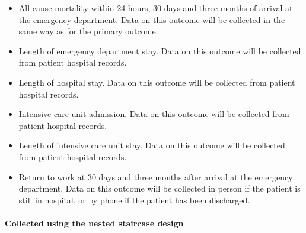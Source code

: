 \documentclass[
]{scrartcl}
\let\oldparagraph\paragraph
\renewcommand{\paragraph}[1]{\oldparagraph{#1}\mbox{}}
\providecommand{\tightlist}{%
  \setlength{\itemsep}{0pt}\setlength{\parskip}{0pt}}\usepackage{longtable,booktabs,array}
\begin{document}
\begin{itemize}
\tightlist
\item
  All cause mortality within 24 hours, 30 days and three months of
  arrival at the emergency department. Data on this outcome will be
  collected in the same way as for the primary outcome.
\item
  Length of emergency department stay. Data on this outcome will be
  collected from patient hospital records.
\item
  Length of hospital stay. Data on this outcome will be collected from
  patient hospital records.
\item
  Intensive care unit admission. Data on this outcome will be collected
  from patient hospital records.
\item
  Length of intensive care unit stay. Data on this outcome will be
  collected from patient hospital records.
\item
  Return to work at 30 days and three months after arrival at the
  emergency department. Data on this outcome will be collected in person
  if the patient is still in hospital, or by phone if the patient has
  been discharged.
\end{itemize}

\hypertarget{collected-using-the-nested-staircase-design}{%
\paragraph{Collected using the nested staircase
design}\label{collected-using-the-nested-staircase-design}}
\end{document}
